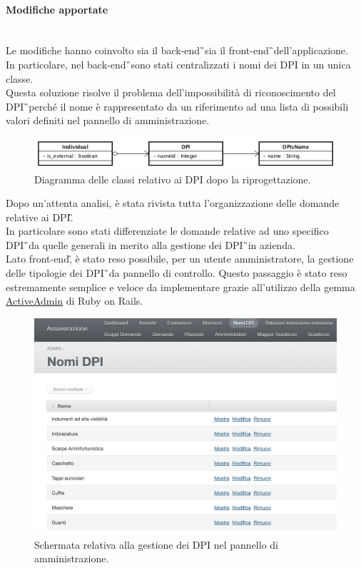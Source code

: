 \paragraph*{Modifiche apportate}\mbox{} \\
Le modifiche hanno coinvolto sia il \gls{back-end}\G\ sia  il  \gls{front-end}\G\ dell'applicazione. \\
In particolare, nel  \gls{back-end}\G\ sono stati centralizzati i nomi dei \gls{DPI} in un unica classe. \\ 
Questa soluzione risolve il problema dell'impossibilità di riconoscimento del \gls{DPI}\G\ perché il nome è rappresentato da un riferimento ad una lista di possibili valori definiti nel pannello di amministrazione. \\
\begin{figure}[H]
	\begin{center}
		\includegraphics[width=14cm]{Pics/UMLClassiDPIRiprogettato.png}
		\caption{Diagramma delle classi relativo ai DPI dopo la riprogettazione.}
		\label{fig:UMLClassiDPIriprogettato}
	\end{center}
\end{figure}

Dopo un'attenta analisi, è stata rivista tutta l'organizzazione delle domande relative ai \gls{DPI}\G.\\
In particolare sono stati differenziate le domande relative ad uno specifico \gls{DPI}\G\ da quelle generali in merito alla gestione dei \gls{DPI}\G\ in azienda.\\
Lato \gls{front-end}\G, è stato reso possibile, per un utente amministratore, la gestione delle tipologie dei \gls{DPI}\G\ da pannello di controllo. Questo passaggio è stato reso estremamente semplice e veloce da implementare grazie all'utilizzo della gemma \hyperref[sec:ActiveAdmin]{ActiveAdmin} di Ruby on Rails.
\newpage
\begin{figure}[H]
	\begin{center}
		\includegraphics[width=12cm]{Pics/ActiveAdminDPI}
		\caption{Schermata relativa alla gestione dei DPI nel pannello di amministrazione.}
		\label{fig:ActiveAdminDPI}
	\end{center}
\end{figure}


